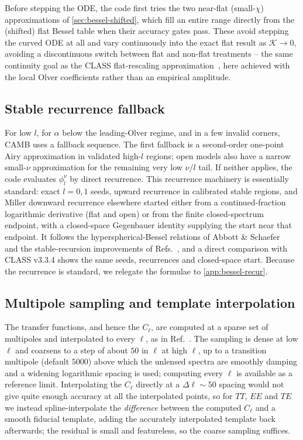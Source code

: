 \documentclass[prd, twocolumn, superscriptaddress, tightenlines, longbibliography, nofootinbib, eqsecnum, amsfonts, amsmath, floatfix, notitlepage]{revtex4-2}
\begin{document}
Before stepping the ODE, the code first tries the two near-flat (small-$\chi$) approximations of
\cref{sec:bessel-shifted}, which fill an entire range directly from the (shifted) flat Bessel
table when their accuracy gates pass. These avoid stepping the curved ODE at all and
vary continuously into the exact flat result as $\mathcal K\to0$,
avoiding a discontinuous switch between flat and non-flat treatments -- the same
continuity goal as the \textsc{CLASS} flat-rescaling
approximation~\cite{lesgourgues-tram2013}, here achieved with the local Olver
coefficients rather than an empirical amplitude.

\subsection{Stable recurrence fallback}
\label{sec:bessel-recur}

For low $l$, for $\alpha$ below the leading-Olver regime, and in a few invalid
corners, \textsc{CAMB} uses a fallback sequence. The first fallback is a
second-order one-point Airy approximation in validated high-$l$ regions; open
models also have a narrow small-$\nu$ approximation for the remaining very low
$\nu/l$ tail. If neither applies, the code evaluates $\phi_l^\nu$ by direct
recurrence. This recurrence machinery is essentially
standard: exact $l=0,1$ seeds, upward recurrence in calibrated stable regions, and
Miller downward recurrence elsewhere started either from a continued-fraction
logarithmic derivative (flat and open) or from the finite closed-spectrum
endpoint, with a closed-space Gegenbauer identity supplying the start near that
endpoint. It follows the hyperspherical-Bessel relations of Abbott \&
Schaefer~\cite{abbott-schaefer} and the stable-recursion improvements of
Refs.~\cite{tram2013,lesgourgues-tram2013}, and a direct comparison with
\textsc{CLASS} v3.3.4 shows the same seeds, recurrences and closed-space start.
Because the recurrence is standard, we relegate the formulae to \cref{app:bessel-recur}.


\subsection{Multipole sampling and template interpolation}
\label{sec:bessel-lsampling}

The transfer functions, and hence the $C_\ell$, are computed at a sparse set of
multipoles and interpolated to every $\ell$, as in
Ref.~\cite{Howlett:2012mh}. The sampling is dense at low $\ell$ and coarsens to a
step of about $50$ in $\ell$ at high $\ell$, up to a transition multipole (default
$5000$) above which the unlensed spectra are smoothly damping and a widening
logarithmic spacing is used; computing every $\ell$ is available as a reference
limit. Interpolating the $C_\ell$ directly at a $\Delta\ell\sim50$ spacing would
not give quite enough accuracy at all the interpolated points, so for $TT$, $EE$ and $TE$ we instead
spline-interpolate the \emph{difference} between the computed $C_\ell$ and a smooth
fiducial template, adding the accurately interpolated template back afterwards;
the residual is small and featureless, so the coarse sampling suffices.
\end{document}
